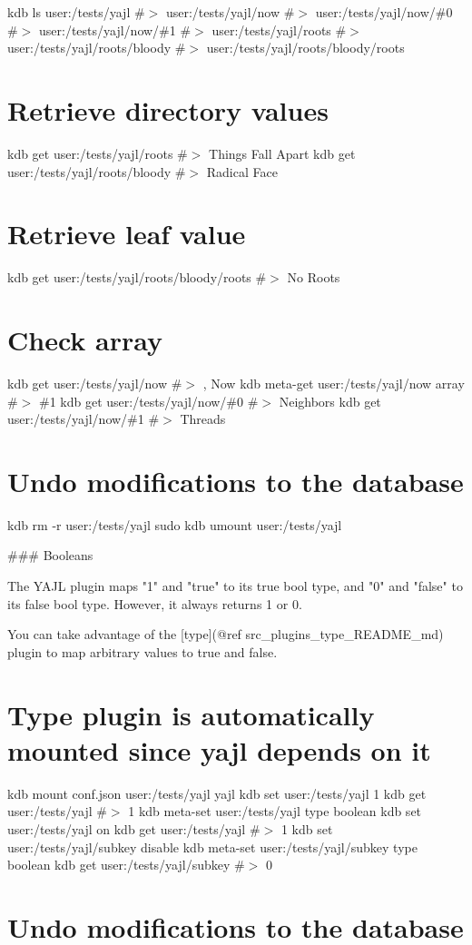 kdb ls user\+:/tests/yajl \#$>$ user\+:/tests/yajl/now \#$>$ user\+:/tests/yajl/now/\#0 \#$>$ user\+:/tests/yajl/now/\#1 \#$>$ user\+:/tests/yajl/roots \#$>$ user\+:/tests/yajl/roots/bloody \#$>$ user\+:/tests/yajl/roots/bloody/roots\hypertarget{autotoc_md786_autotoc_md811}{}\section{Retrieve directory values}\label{autotoc_md786_autotoc_md811}
kdb get user\+:/tests/yajl/roots \#$>$ Things Fall Apart kdb get user\+:/tests/yajl/roots/bloody \#$>$ Radical Face\hypertarget{autotoc_md786_autotoc_md812}{}\section{Retrieve leaf value}\label{autotoc_md786_autotoc_md812}
kdb get user\+:/tests/yajl/roots/bloody/roots \#$>$ No Roots\hypertarget{autotoc_md786_autotoc_md813}{}\section{Check array}\label{autotoc_md786_autotoc_md813}
kdb get user\+:/tests/yajl/now \#$>$ , Now kdb meta-\/get user\+:/tests/yajl/now array \#$>$ \#1 kdb get user\+:/tests/yajl/now/\#0 \#$>$ Neighbors kdb get user\+:/tests/yajl/now/\#1 \#$>$ Threads\hypertarget{autotoc_md786_autotoc_md814}{}\section{Undo modifications to the database}\label{autotoc_md786_autotoc_md814}
kdb rm -\/r user\+:/tests/yajl sudo kdb umount user\+:/tests/yajl 
\begin{DoxyCode}
### Booleans

The YAJL plugin maps "1" and "true" to its true bool type, and "0" and "false" to its false bool type.
However, it always returns 1 or 0.

You can take advantage of the [type](@ref src\_plugins\_type\_README\_md) plugin to map arbitrary values to
       true and false.
\end{DoxyCode}
 \hypertarget{autotoc_md786_autotoc_md815}{}\section{Type plugin is automatically mounted since yajl depends on it}\label{autotoc_md786_autotoc_md815}
kdb mount conf.\+json user\+:/tests/yajl yajl kdb set user\+:/tests/yajl 1 kdb get user\+:/tests/yajl \#$>$ 1 kdb meta-\/set user\+:/tests/yajl type boolean kdb set user\+:/tests/yajl on kdb get user\+:/tests/yajl \#$>$ 1 kdb set user\+:/tests/yajl/subkey disable kdb meta-\/set user\+:/tests/yajl/subkey type boolean kdb get user\+:/tests/yajl/subkey \#$>$ 0\hypertarget{autotoc_md786_autotoc_md816}{}\section{Undo modifications to the database}\label{autotoc_md786_autotoc_md816}
